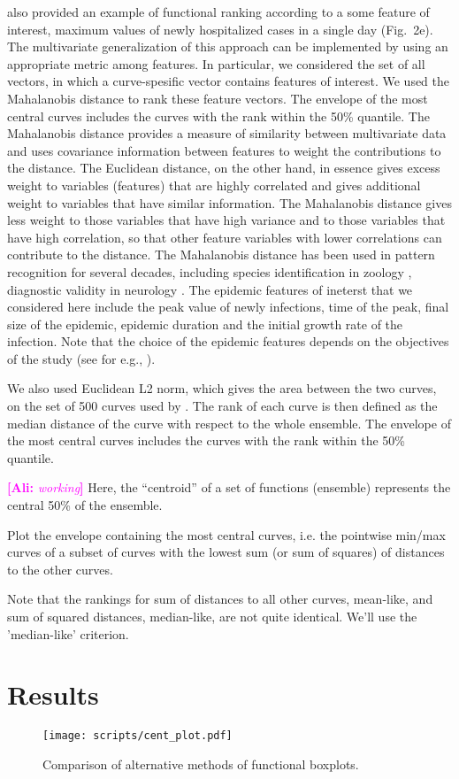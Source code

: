 \documentclass[12pt]{article}
\newcommand{\comment}{\showcomment}
\newcommand{\showcomment}[3]{\textcolor{#1}{\textbf{[#2: }\textsl{#3}\textbf{]}}}
\newcommand{\ali}[1]{\comment{magenta}{Ali}{#1}}
\theoremstyle{definition} %
\begin{document}
\cite{juul2021fixed} also provided an example of functional ranking according to a some feature of interest, maximum values of newly hospitalized cases in a single day (Fig.~2e). The multivariate generalization of this approach can be implemented by using an appropriate metric among features. In particular, we considered the set of all vectors, in which a curve-spesific vector contains features of interest. We used the Mahalanobis distance \citep{mahalanobis1936generalized} to rank these feature vectors. The envelope of the most central curves includes the curves with the rank within the 50\% quantile. The Mahalanobis distance provides a measure of similarity between multivariate data and uses covariance information between features to weight the contributions to the distance. The Euclidean distance, on the other hand, in essence gives excess weight to variables (features) that are highly correlated and gives additional weight to variables that have similar information. The Mahalanobis distance gives less weight to those variables that have high variance and to those variables that have high correlation, so that other feature variables with lower correlations can contribute to the distance. The Mahalanobis distance has been used in pattern recognition for several decades,
including species identification in zoology \citep{robinson1975geographical}, diagnostic validity in neurology \citep{john1988neurometrics}. The epidemic features of ineterst that we considered here include the peak value of newly infections, time of the peak, final size of the epidemic, epidemic duration and the initial growth rate of the infection. Note that the choice of the epidemic features depends on the objectives of the study (see for e.g., \cite{probert2016decision}).

We also used Euclidean L2 norm, which gives the area between the two curves, on the set of 500 curves used by \cite{juul2021fixed}. The rank of each curve is then defined as the median distance of the curve with respect to the whole ensemble. The envelope of the most central curves includes the curves with the rank within the 50\% quantile.

\ali{working}
Here, the ``centroid'' of a set of functions (ensemble) represents the central 50\% of the ensemble.



Plot the envelope containing the most central curves, i.e. the pointwise min/max curves of a subset of curves with the lowest sum (or sum of squares) of distances to the other curves.

Note that the rankings for sum of distances to all other curves, mean-like, and sum of squared distances, median-like, are not quite identical. We'll use the 'median-like' criterion.


\section{Results}

\begin{figure}[h!]
\centering
\texttt{[image: scripts/cent\_plot.pdf]}
\caption{Comparison of alternative methods of functional boxplots.}\label{p.a}
\end{figure}



\end{document}

